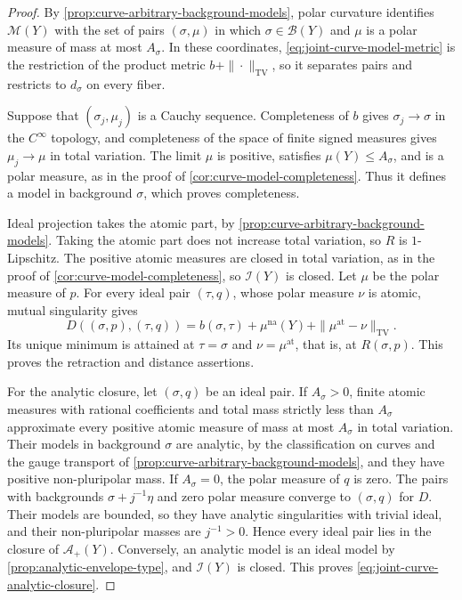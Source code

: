 \begin{proof}
By \cref{prop:curve-arbitrary-background-models}, polar curvature identifies $\mathscr M(Y)$ with the set of pairs $(\sigma,\mu)$ in which $\sigma\in\mathcal B(Y)$ and $\mu$ is a polar measure of mass at most $A_\sigma$. In these coordinates, \eqref{eq:joint-curve-model-metric} is the restriction of the product metric $b+\|\cdot\|_{\mathrm{TV}}$, so it separates pairs and restricts to $d_\sigma$ on every fiber.

Suppose that $(\sigma_j,\mu_j)$ is a Cauchy sequence. Completeness of $b$ gives $\sigma_j\to\sigma$ in the $C^\infty$ topology, and completeness of the space of finite signed measures gives $\mu_j\to\mu$ in total variation. The limit $\mu$ is positive, satisfies $\mu(Y)\leq A_\sigma$, and is a polar measure, as in the proof of \cref{cor:curve-model-completeness}. Thus it defines a model in background $\sigma$, which proves completeness.

Ideal projection takes the atomic part, by \cref{prop:curve-arbitrary-background-models}. Taking the atomic part does not increase total variation, so $R$ is $1$-Lipschitz. The positive atomic measures are closed in total variation, as in the proof of \cref{cor:curve-model-completeness}, so $\mathscr I(Y)$ is closed. Let $\mu$ be the polar measure of $p$. For every ideal pair $(\tau,q)$, whose polar measure $\nu$ is atomic, mutual singularity gives
\[
 D((\sigma,p),(\tau,q))
 =b(\sigma,\tau)+\mu^{\mathrm{na}}(Y)
                         +\|\mu^{\mathrm{at}}-\nu\|_{\mathrm{TV}}.
\]
Its unique minimum is attained at $\tau=\sigma$ and $\nu=\mu^{\mathrm{at}}$, that is, at $R(\sigma,p)$. This proves the retraction and distance assertions.

For the analytic closure, let $(\sigma,q)$ be an ideal pair. If $A_\sigma>0$, finite atomic measures with rational coefficients and total mass strictly less than $A_\sigma$ approximate every positive atomic measure of mass at most $A_\sigma$ in total variation. Their models in background $\sigma$ are analytic, by the classification on curves and the gauge transport of \cref{prop:curve-arbitrary-background-models}, and they have positive non-pluripolar mass. If $A_\sigma=0$, the polar measure of $q$ is zero. The pairs with backgrounds $\sigma+j^{-1}\eta$ and zero polar measure converge to $(\sigma,q)$ for $D$. Their models are bounded, so they have analytic singularities with trivial ideal, and their non-pluripolar masses are $j^{-1}>0$. Hence every ideal pair lies in the closure of $\mathscr A_+(Y)$. Conversely, an analytic model is an ideal model by \cref{prop:analytic-envelope-type}, and $\mathscr I(Y)$ is closed. This proves \eqref{eq:joint-curve-analytic-closure}.


\end{proof}
